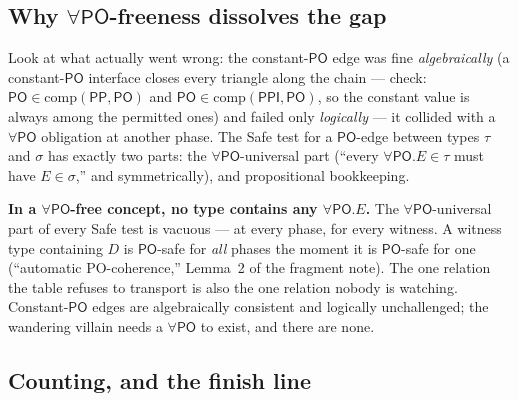 \documentclass[11pt]{article}
\newcommand{\PO}{\ensuremath{\mathsf{PO}}}
\newcommand{\PP}{\ensuremath{\mathsf{PP}}}
\newcommand{\PPI}{\ensuremath{\mathsf{PPI}}}
\newcommand{\Comp}{\mathrm{comp}}
\begin{document}
\subsection{Why $\forall\PO$-freeness dissolves the
gap}\label{ssec:dissolve}

Look at what actually went wrong: the constant-$\PO$ edge was fine
\emph{algebraically} (a constant-$\PO$ interface closes every triangle
along the chain --- check: $\PO\in\Comp(\PP,\PO)$ and
$\PO\in\Comp(\PPI,\PO)$, so the constant value is always among the
permitted ones) and failed only \emph{logically} --- it collided with a
$\forall\PO$ obligation at another phase. The Safe test for a
$\PO$-edge between types $\tau$ and $\sigma$ has exactly two parts: the
$\forall\PO$-universal part (``every $\forall\PO.E\in\tau$ must have
$E\in\sigma$,'' and symmetrically), and propositional bookkeeping.

\textbf{In a $\forall\PO$-free concept, no type contains any
$\forall\PO.E$.} The $\forall\PO$-universal part of every Safe test is
vacuous --- at every phase, for every witness. A witness type
containing $D$ is $\PO$-safe for \emph{all} phases the moment it is
$\PO$-safe for one (``automatic PO-coherence,'' Lemma~2 of the fragment
note). The one relation the table refuses to transport is also the one
relation nobody is watching. Constant-$\PO$ edges are algebraically
consistent and logically unchallenged; the wandering villain needs a
$\forall\PO$ to exist, and there are none.

\subsection{Counting, and the finish line}\label{ssec:count}
\end{document}
